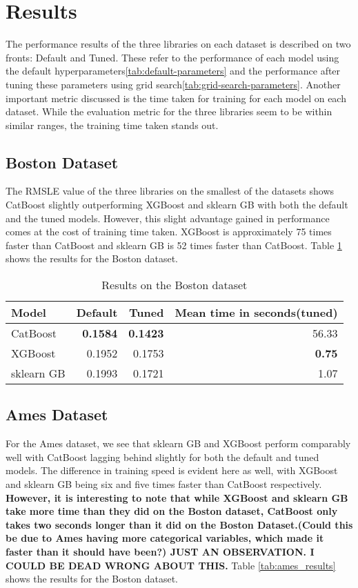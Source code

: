 \section{Results}
\label{sec:results}
The performance results of the three libraries on each dataset is described on two fronts: Default and Tuned. These refer to the performance of each model using the default hyperparameters\cref{tab:default-parameters} and the performance after tuning these parameters using grid search\cref{tab:grid-search-parameters}. Another important metric discussed is the time taken for training for each model on each dataset. While the evaluation metric for the three libraries seem to be within similar ranges, the training time taken stands out.

\subsection{Boston Dataset}
The RMSLE value of the three libraries on the smallest of the datasets shows CatBoost slightly outperforming XGBoost and sklearn GB with both the default and the tuned models. However, this slight advantage gained in performance comes at the cost of training time taken. XGBoost is approximately 75 times faster than CatBoost and sklearn GB is 52 times faster than CatBoost. Table \cref{tab:boston_results} shows the results for the Boston dataset.

\begin{table}
				\centering
				\begin{tabular}{lrrr}
					\toprule
					\textbf{Model} & \textbf{Default} & \textbf{Tuned} & \textbf{Mean time in seconds(tuned)} \\
					\midrule
					CatBoost & \textbf{0.1584} &  \textbf{0.1423}  & 56.33 \\
					XGBoost & 0.1952 & 0.1753 & \textbf{0.75}\\
					sklearn GB & 0.1993 & 0.1721 & 1.07 \\
					\bottomrule
				\end{tabular}
                \caption{Results on the Boston dataset}
				\label{tab:boston_results}
			\end{table}

\subsection{Ames Dataset}
For the Ames dataset, we see that sklearn GB and XGBoost perform comparably well with CatBoost lagging behind slightly for both the default and tuned models. The difference in training speed is evident here as well, with  
XGBoost and sklearn GB being six and five times faster than CatBoost respectively.\textbf{ However, it is interesting to note that while XGBoost and sklearn GB take more time than they did on the Boston dataset, CatBoost only takes two seconds longer than it did on the Boston Dataset.(Could this be due to Ames having more categorical variables, which made it faster than it should have been?) 	JUST AN OBSERVATION. I COULD BE DEAD WRONG ABOUT THIS.} Table \cref{tab:ames_results} shows the results for the Boston dataset.

